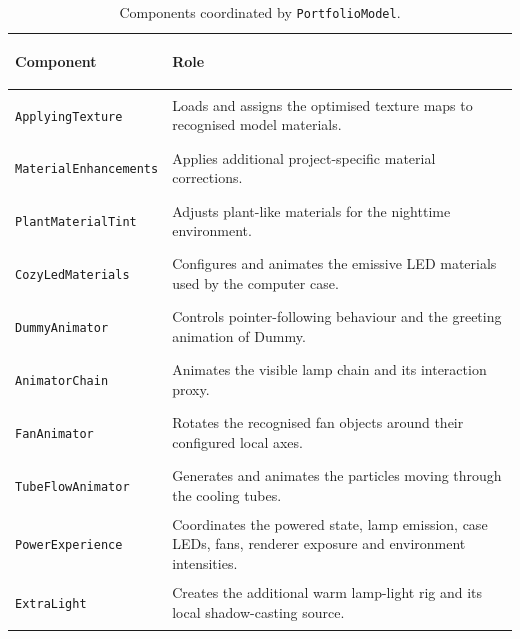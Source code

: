 \documentclass{report}
\begin{document}
\begin{table}[ht]
    \centering
    \small
    \setlength{\tabcolsep}{6pt}
    \renewcommand{\arraystretch}{1.2}

    \begin{tabularx}{\textwidth}{
        @{}
        >{\bfseries\raggedright\arraybackslash}p{}
        >{\raggedright\arraybackslash}X
        @{}
    }
        \toprule
        Component & Role \\
        \midrule

        \texttt{ApplyingTexture}
        &
        Loads and assigns the optimised texture maps to recognised
        model materials.
        \\

        \texttt{MaterialEnhancements}
        &
        Applies additional project-specific material corrections.
        \\

        \texttt{PlantMaterialTint}
        &
        Adjusts plant-like materials for the nighttime environment.
        \\

        \texttt{CozyLedMaterials}
        &
        Configures and animates the emissive LED materials used by the
        computer case.
        \\

        \texttt{DummyAnimator}
        &
        Controls pointer-following behaviour and the greeting animation
        of Dummy.
        \\

        \texttt{AnimatorChain}
        &
        Animates the visible lamp chain and its interaction proxy.
        \\

        \texttt{FanAnimator}
        &
        Rotates the recognised fan objects around their configured local
        axes.
        \\

        \texttt{TubeFlowAnimator}
        &
        Generates and animates the particles moving through the cooling
        tubes.
        \\

        \texttt{PowerExperience}
        &
        Coordinates the powered state, lamp emission, case LEDs, fans,
        renderer exposure and environment intensities.
        \\

        \texttt{ExtraLight}
        &
        Creates the additional warm lamp-light rig and its local
        shadow-casting source.
        \\

        \bottomrule
    \end{tabularx}

    \caption{Components coordinated by \texttt{PortfolioModel}.}
    \label{tab:portfolio-model-components}
\end{table}
\end{document}

